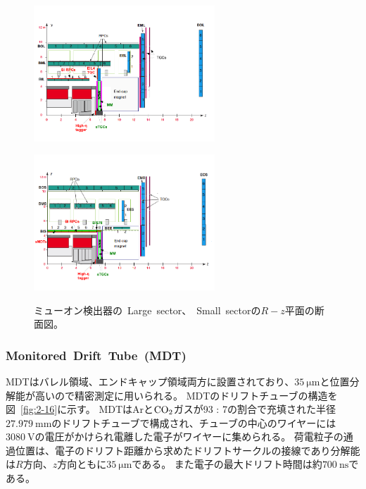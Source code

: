 
\begin{figure}[h]
  \begin{minipage}[b]{0.48\linewidth}
      \centering
      \includegraphics[clip, width=6.8cm]{fig/2/muon_Rz_Large.pdf}
      \label{fig:2-15-1}
  \end{minipage}
    \begin{minipage}[b]{0.48\linewidth}
      \centering
      \includegraphics[clip, width=6.8cm]{fig/2/muon_Rz_small.pdf}
      \label{fig:2-15-2}
  \end{minipage}
  \caption{ミューオン検出器の~Large~sector、~Small~sectorの$R-z$平面の断面図\cite{article:phase2}。}
\end{figure}

\subsubsection{Monitored~Drift~Tube~(MDT)}
MDTはバレル領域、エンドキャップ領域両方に設置されており、$\SI{35}{\um}$と位置分解能が高いので精密測定に用いられる。
MDTのドリフトチューブの構造を図~\ref{fig:2-16}に示す。
MDTはArと$\rm{CO_{2}}$ガスが93 : 7の割合で充填された半径$\SI{27.979}{\mm}$のドリフトチューブで構成され、チューブの中心のワイヤーには$\SI{3080}{\V}$の電圧がかけられ電離した電子がワイヤーに集められる。
荷電粒子の通過位置は、電子のドリフト距離から求めたドリフトサークルの接線であり分解能は$R$方向、$z$方向ともに$\SI{35}{\um}$である。
また電子の最大ドリフト時間は約$\SI{700}{\ns}$である。

